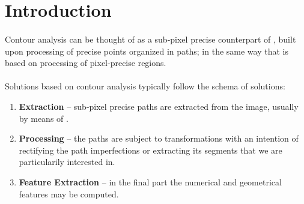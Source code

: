 \section{Introduction}

\paragraph*{}
Contour analysis can be thought of as a sub-pixel precise counterpart of , built upon processing of precise points organized in paths; in the same way that  is based on processing of pixel-precise regions.

\paragraph*{}
Solutions based on contour analysis typically follow the schema of  solutions:

\begin{enumerate}
	\item \textbf{Extraction} -- sub-pixel precise paths are extracted from the image, usually by means of .
	\item \textbf{Processing} -- the paths are subject to transformations with an intention of rectifying the path imperfections or extracting its segments that we are particularily interested in.
	\item \textbf{Feature Extraction} -- in the final part the numerical and geometrical features may be computed.
\end{enumerate}
